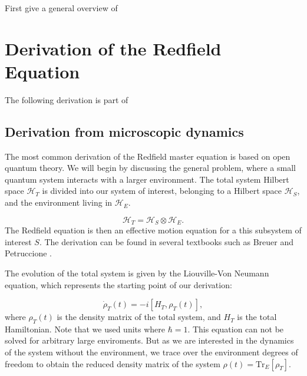 First give a general overview of

\chapter{Derivation of the Redfield Equation} %
\label{Chapter:Derivation_Redfield_Equation} %

The following derivation is part of \cite{Manzano2020ShortIntroductionLindblad}

\section{Derivation from microscopic dynamics}
\label{sec:Derivation_redfield_eq_from_microscopic_dynamics}
The most common derivation of the Redfield master equation is based on open quantum theory.
We will begin by discussing the general problem, where a small quantum system interacts with a larger environment.
The total system Hilbert space $\mathcal{H}_T$ is divided into our system of interest, belonging to a Hilbert space $\mathcal{H}_S$, and the environment living in $\mathcal{H}_E$.

\begin{equation}
    \mathcal{H}_T = \mathcal{H}_S \otimes \mathcal{H}_E.
    \label{eq:Total_Hilbert_Space}
\end{equation}
The Redfield equation is then an effective motion equation for a this subsystem of interest $ S $.
The derivation can be found in several textbooks such as Breuer and Petruccione \cite{BreuerPetruccione2009TheoryOpenQuantum}.

The evolution of the total system is given by the Liouville-Von Neumann equation, which represents the starting point of our derivation:

\begin{equation}
    \dot{\rho}_T(t) = -i[H_T, \rho_T(t)],
    \label{eq:Von_Neumann_Equation}
\end{equation}
where $\rho_T(t)$ is the density matrix of the total system, and $H_T$ is the total Hamiltonian.
Note that we used units where $\hbar = 1$.
This equation can not be solved for arbitrary large enviroments.
But as we are interested in the dynamics of the system without the environment,
we trace over the environment degrees of freedom to obtain the reduced density matrix of the system
$\rho(t) = \mathrm{Tr}_E[\rho_T]$.

